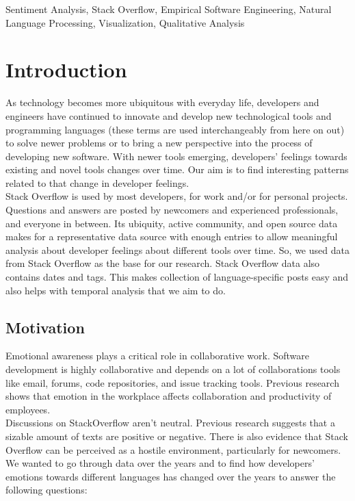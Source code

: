 \documentclass[conference]{IEEEtran}
\begin{document}
\begin{IEEEkeywords}
Sentiment Analysis, Stack Overflow, Empirical Software Engineering, Natural Language Processing, Visualization, Qualitative Analysis
\end{IEEEkeywords}

\section{Introduction}
As technology becomes more ubiquitous with everyday life, developers and engineers have continued to innovate and develop new technological tools and programming languages (these terms are used interchangeably from here on out) to solve newer problems or to bring a new perspective into the process of developing new software. With newer tools emerging, developers' feelings towards existing and novel tools changes over time. Our aim is to find interesting patterns related to that change in developer feelings. \\

Stack Overflow is used by most developers, for work and/or for personal projects. Questions and answers are posted by newcomers and experienced professionals, and everyone in between. Its ubiquity, active community, and open source data makes for a representative data source with enough entries to allow meaningful analysis about developer feelings about different tools over time. So, we used data from Stack Overflow as the base for our research. Stack Overflow data also contains dates and tags. This makes collection of language-specific posts easy and also helps with temporal analysis that we aim to do.

\subsection{Motivation}
Emotional awareness plays a critical role in collaborative work. Software development is highly collaborative and depends on a lot of collaborations tools like email, forums, code repositories, and issue tracking tools\cite{b1}. Previous research shows that emotion in the workplace affects collaboration and productivity of employees\cite{b2}. \\

Discussions on StackOverflow aren't neutral. Previous research suggests that a sizable amount of texts are positive or negative\cite{b3, b4, b5}. There is also evidence that Stack Overflow can be perceived as a hostile environment, particularly for newcomers\cite{b6}. We wanted to go through data over the years and to find how developers' emotions towards different languages has changed over the years to answer the following questions:
\end{document}
